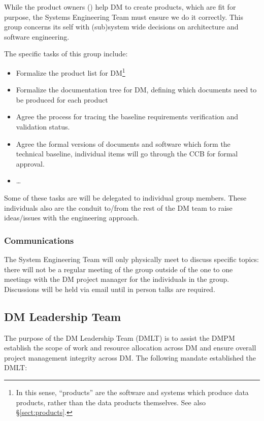 While the product owners () help DM to create products, which are fit for purpose, the Systems Engineering Team must ensure we do it correctly. This group concerns its self with (sub)system wide decisions on architecture and software engineering.

The specific tasks of this group include:

\begin{itemize}
\item Formalize the product list for DM\footnote{In this sense, ``products'' are the software and systems which produce data products, rather than the data products themselves. See also \S\ref{sect:products}.}
\item Formalize the documentation tree for DM, defining which documents need to be produced for each product
\item Agree the process for tracing the baseline requirements verification and validation status.
\item Agree the formal versions of documents and software which form the technical baseline, individual items will go through the CCB for formal approval.
\item  \ldots
\end{itemize}

Some of these tasks are will be delegated to individual group members.
These individuals also are the conduit to/from the rest of the DM team to raise ideas/issues with the engineering approach.

\subsubsection{Communications}

The System Engineering Team will only physically meet to discuss specific topics: there will not be a regular meeting of the group outside of the one to one meetings with the DM project manager for the individuals in the group.
Discussions will be held via email until in person talks are required.

\subsection{DM Leadership Team \label{sect:dmlt}}

The purpose of the DM Leadership Team (DMLT) is to assist the DMPM  establish the scope of work and resource allocation across DM and ensure overall project management integrity across DM.
The following mandate established the DMLT:

